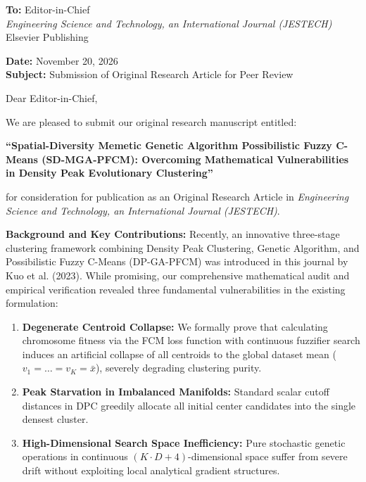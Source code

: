 \documentclass[11pt]{article}
\begin{document}
\noindent \textbf{To:} Editor-in-Chief\\
\textit{Engineering Science and Technology, an International Journal (JESTECH)}\\
Elsevier Publishing

\vspace{1em}

\noindent \textbf{Date:} November 20, 2026\\
\textbf{Subject:} Submission of Original Research Article for Peer Review

\vspace{1.5em}

\noindent Dear Editor-in-Chief,

\vspace{1em}

\noindent We are pleased to submit our original research manuscript entitled:

\begin{center}
\textbf{``Spatial-Diversity Memetic Genetic Algorithm Possibilistic Fuzzy C-Means (SD-MGA-PFCM): Overcoming Mathematical Vulnerabilities in Density Peak Evolutionary Clustering''}
\end{center}

\noindent for consideration for publication as an Original Research Article in \textit{Engineering Science and Technology, an International Journal (JESTECH)}.

\vspace{1em}

\noindent \textbf{Background and Key Contributions:}
Recently, an innovative three-stage clustering framework combining Density Peak Clustering, Genetic Algorithm, and Possibilistic Fuzzy C-Means (DP-GA-PFCM) was introduced in this journal by Kuo et al. (2023). While promising, our comprehensive mathematical audit and empirical verification revealed three fundamental vulnerabilities in the existing formulation:
\begin{enumerate}
    \item \textbf{Degenerate Centroid Collapse:} We formally prove that calculating chromosome fitness via the FCM loss function with continuous fuzzifier search induces an artificial collapse of all centroids to the global dataset mean ($v_1 = \dots = v_K = \bar{x}$), severely degrading clustering purity.
    \item \textbf{Peak Starvation in Imbalanced Manifolds:} Standard scalar cutoff distances in DPC greedily allocate all initial center candidates into the single densest cluster.
    \item \textbf{High-Dimensional Search Space Inefficiency:} Pure stochastic genetic operations in continuous $(K \cdot D + 4)$-dimensional space suffer from severe drift without exploiting local analytical gradient structures.
\end{enumerate}
\end{document}
